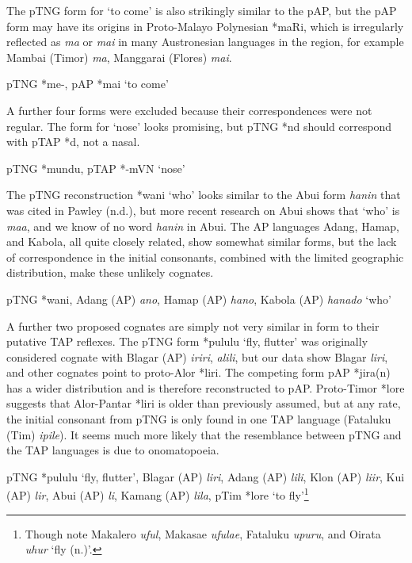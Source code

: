 The pTNG form for `to come' is also strikingly similar to the pAP, but the pAP form may have its origins in Proto-Malayo Polynesian *maRi, which is irregularly reflected as \textit{ma }or \textit{mai }in many Austronesian languages in the region, for example Mambai (Timor) \textit{ma}, Manggarai (Flores) \textit{mai}.

\ea%
   pTNG *me-, pAP *mai `to come'  
\z

A further four forms were excluded because their correspondences were not regular. The form for `nose' looks promising, but pTNG *nd should correspond with pTAP *d, not a nasal.

\ea%
   pTNG *mundu, pTAP *-mVN `nose'   
\z

The pTNG reconstruction *wani `who' looks similar to the Abui form \textit{hanin} that was cited in Pawley (n.d.), but more recent research on Abui shows that `who' is \textit{maa}, and we know of  no word \textit{hanin} in Abui. The AP languages Adang, Hamap, and Kabola, all quite closely related, show somewhat similar forms, but the lack of correspondence in the initial consonants, combined with the limited geographic distribution, make these unlikely cognates.

\ea%
   pTNG *wani, Adang (AP) \textit{ano}, Hamap (AP) \textit{hano}, Kabola (AP) \textit{hanado} `who' 
\z

A further two proposed cognates are simply not very similar in form to their putative TAP reflexes. The pTNG form *pululu `fly, flutter' was originally considered cognate with Blagar (AP) \textit{iriri}, \textit{alili}, but our data show Blagar \textit{liri}, and other cognates point to proto-Alor *liri. The competing form pAP *jira(n) has a wider distribution and is therefore reconstructed to pAP. Proto-Timor *lore suggests that Alor-Pantar *liri is older than previously assumed, but at any rate, the initial consonant from pTNG is only found in one TAP language (Fataluku (Tim) \textit{ipile}). It seems much more likely that the resemblance between pTNG and the TAP languages is due to onomatopoeia.

\ea%
   pTNG *pululu `fly, flutter', Blagar (AP) \textit{liri}, Adang (AP) \textit{lili}\textit{{\textglotstop}}, Klon (AP) \textit{liir}, Kui (AP) \textit{lir}, Abui (AP) \textit{li}\textit{{\textglotstop}}, Kamang (AP) \textit{lila}, pTim *lore `to fly'\footnote{Though note Makalero \textit{uful}, Makasae \textit{ufulae}, Fataluku \textit{upuru}, and Oirata \textit{uhur} `fly (n.)'. }  
\z

